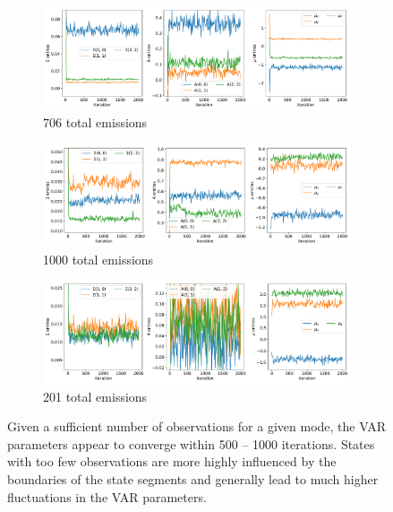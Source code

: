 \documentclass{article}
\begin{document}
  \begin{figure}[h]
  \centering
  \begin{subfigure}{0.8\textwidth}
  \includegraphics[width=\textwidth]{convergence_MET_47.pdf}
  \caption{706 total emissions}\label{fig:convergence3d_MET_low}
  \end{subfigure}
  \begin{subfigure}{0.8\textwidth}
  \includegraphics[width=\textwidth]{convergence_MET_36.pdf}
  \caption{1000 total emissions}\label{fig:convergence3d_MET_medium}
  \end{subfigure}
  \begin{subfigure}{0.8\textwidth}
  \includegraphics[width=\textwidth]{convergence_MET_59.pdf}
  \caption{201 total emissions}\label{fig:convergence3d_MET_high}
  \end{subfigure}
  \caption{Given a sufficient number of observations for a given mode, the VAR parameters
  appear to converge within 500 -- 1000 iterations. States with too few observations
  are more highly influenced by the boundaries of the state segments and generally
  lead to much higher fluctuations in the VAR parameters.}\label{fig:convergence3d}
  \end{figure}
  
\end{document}
